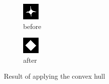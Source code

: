 \documentclass[12pt]{article}
\renewcommand{\subfiguresize}{.25\textwidth}
\begin{document}
\begin{figure}[h]
    \begin{subfigure}[t]{\subfiguresize}
        \includegraphics[width=\textwidth]{img/image2.png}
        \caption{before}
    \end{subfigure}
    \hspace{2em}
    \begin{subfigure}[t]{\subfiguresize}
        \includegraphics[width=\textwidth]{img/image2-convexhull.png}
        \caption{after}
    \end{subfigure}
    \caption{Result of applying the convex hull}
\end{figure}
\end{document}
